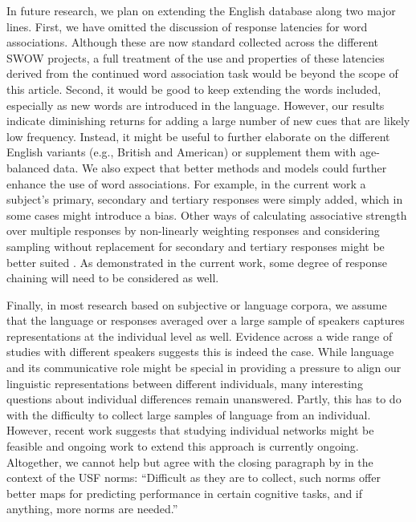 \documentclass[a4paper,doc,natbib,floatsintext]{apa6}
\begin{document}
In future research, we plan on extending the English database along two major lines. First, we have omitted the discussion of response latencies for word associations. Although these are now standard collected across the different SWOW projects, a full treatment of the use and properties of these latencies derived from the continued word association task would be beyond the scope of this article. Second, it would be good to keep extending the words included, especially as new words are introduced in the language. However, our results indicate diminishing returns for adding a large number of new cues that are likely low frequency. Instead, it might be useful to further elaborate on the different English variants (e.g., British and American) or supplement them with age-balanced data.
We also expect that better methods and models could further enhance the use of word associations. For example, in the current work a subject's primary, secondary and tertiary responses were simply added, which in some cases might introduce a bias. Other ways of calculating associative strength over multiple responses by non-linearly weighting responses and considering sampling without replacement for secondary and tertiary responses might be better suited \citep{DeDeyne2013c,Maki2008}. As demonstrated in the current work, some degree of response chaining will need to be considered as well.

Finally, in most research based on subjective or language corpora, we assume that the language or responses averaged over a large sample of speakers captures representations at the individual level as well. Evidence across a wide range of studies with different speakers suggests this is indeed the case.
While language and its communicative role might be special in providing a pressure to align our linguistic representations between different individuals, many interesting questions about individual differences remain unanswered. Partly, this has to do with the difficulty to collect large samples of language from an individual. However, recent work suggests that studying individual networks might be feasible \citep{Austerweil2012,Morais2013} and ongoing work to extend this approach is currently ongoing.
Altogether, we cannot help but agree with the closing paragraph by \citet[][p. 406]{Nelson2004} in the context of the USF norms: ``Difficult as they are to collect, such norms offer better maps for predicting performance in certain cognitive tasks, and if anything, more norms are needed.''
\end{document}
